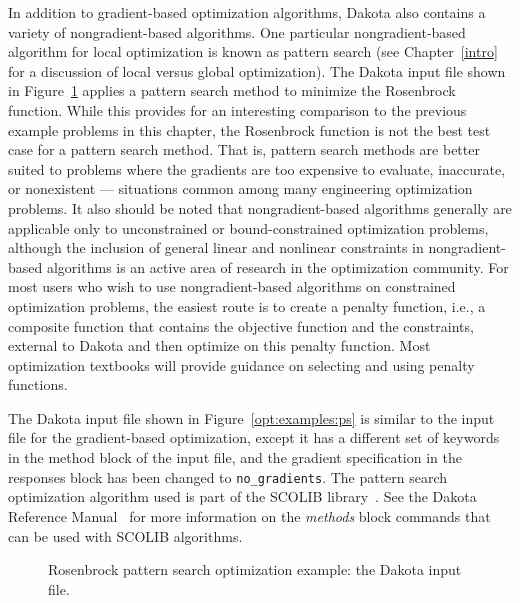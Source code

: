In addition to gradient-based optimization algorithms, Dakota also
contains a variety of nongradient-based algorithms. One particular
nongradient-based algorithm for local optimization is known as pattern
search (see Chapter~\ref{intro} for a discussion of local
versus global optimization). The Dakota input file shown in
Figure~\ref{opt:examples:psfig} applies a pattern
search method to minimize the Rosenbrock function. While this
provides for an interesting comparison to the previous example
problems in this chapter, the Rosenbrock function is not the best test
case for a pattern search method. That is, pattern search methods are
better suited to problems where the gradients are too expensive to
evaluate, inaccurate, or nonexistent --- situations common among many
engineering optimization problems. It also should be noted that
nongradient-based algorithms generally are applicable only to
unconstrained or bound-constrained optimization problems, although the
inclusion of general linear and nonlinear constraints in
nongradient-based algorithms is an active area of research in the
optimization community. For most users who wish to use
nongradient-based algorithms on constrained optimization problems, the
easiest route is to create a penalty function, i.e., a composite
function that contains the objective function and the constraints,
external to Dakota and then optimize on this penalty function. Most
optimization textbooks will provide guidance on selecting and using
penalty functions.

The Dakota input file shown in Figure~\ref{opt:examples:ps} is similar
to the input file for the gradient-based optimization, except it has a
different set of keywords in the method block of the input file, and
the gradient specification in the responses block has been changed to
\texttt{no\_gradients}. The pattern search optimization algorithm used
is part of the SCOLIB library~\cite{Har06}. See the Dakota Reference
Manual~\cite{RefMan} for more information on the \emph{methods} block
commands that can be used with SCOLIB algorithms.

\begin{figure}[ht!]
  \centering
  \begin{bigbox}
    \begin{small}
    \end{small}
  \end{bigbox}
  \caption{Rosenbrock pattern search optimization example: the Dakota input file.}
  \label{opt:examples:psfig}
\end{figure}

